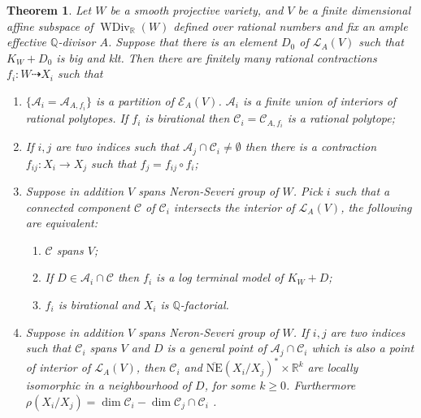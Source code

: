 \documentclass[11pt]{amsart}
\numberwithin{equation}{section}
\newtheorem{thm}[defn]{Theorem}
\begin{document}
\begin{thm}\label{mapbetweenAM}
  \cite[Theorem 3.3]{haconSarkisovProgram2012} Let $W$ be a smooth projective   variety, and  $ V $ be a finite dimensional affine subspace of $ \operatorname{WDiv}_{\mathbb{R}}(W) $ defined over rational numbers and fix an ample effective $\mathbb{Q}$-divisor $A$. Suppose that there is an element $D_{0}$ of $\mathcal{L}_{A}(V)$ such that $K_{W}+D_{0}$ is big and klt. Then there are finitely many rational contractions $ f_i:W\dashrightarrow X_i $ such that
  \begin{enumerate}
    \item $ \{\mathcal{A}_i=\mathcal{A}_{A,f_i}\} $ is a partition of $ \mathcal{E}_{A}(V) $. $ \mathcal{A}_i $ is a finite union of interiors of rational polytopes. If $ f_i $ is birational then $ \mathcal{C}_i=\mathcal{C}_{A,f_i} $ is a rational polytope;
    \item If $ i,j $ are two indices such that $ \mathcal{A}_j\cap \mathcal{C}_i\neq \emptyset $ then there is a contraction $ f_{ij}:X_i\to X_j $ such that $ f_j=f_{ij}\circ f_i $;
    \item Suppose in addition $ V $ spans Neron-Severi group of $W$. Pick $ i $ such that a connected component $ \mathcal{C} $ of $ \mathcal{C}_i $ intersects the interior of $ \mathcal{L}_A(V) $, the following are equivalent:
    \begin{enumerate} 
      \item $ \mathcal{C} $ spans $ V $;
      \item If $ D\in \mathcal{A}_i\cap \mathcal{C} $ then $ f_i $ is a log terminal model of $ K_W+D $;
      \item $ f_i $ is birational and $ X_i $ is $ \mathbb{Q} $-factorial.
    \end{enumerate}
    \item Suppose in addition $ V $ spans Neron-Severi group of $W$. If $ i,j $ are two indices such that $ \mathcal{C}_i $ spans $ V $ and $ D $ is a general point of $ \mathcal{A}_j\cap \mathcal{C}_i $ which is also a point of interior of $ \mathcal{L}_A(V) $, then $ \mathcal{C}_i $ and $ \overline{\mathrm{NE}}(X_i/X_j)^*\times \mathbb{R}^k $ are locally isomorphic in a neighbourhood of $D$,  for some $ k\geqslant 0 $. Furthermore $ \rho(X_i/X_j)=\dim  \mathcal{C}_i-\dim \mathcal{C}_j\cap \mathcal{C}_i   $ .
  \end{enumerate}
\end{thm}
\end{document}
